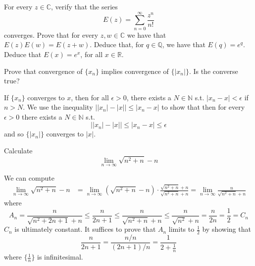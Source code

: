   \begin{exercise}
    For every $z \in \mathbb{C}$, verify that the series
    \begin{equation}
      E(z) = \sum_{n=0}^{\infty} \frac{z^n}{n!}
    \end{equation}
    converges. Prove that for every $z, w \in \mathbb{C}$ we have that $E(z)E(w) = E(z + w)$. Deduce that, for $q \in \mathbb{Q}$, we have that $E(q) = e^q$. Deduce that $E(x) = e^x$, for all $x \in \mathbb{R}$.
  \end{exercise}
  \begin{solution}

  \end{solution}

  
  \begin{exercise}[Rudin 3.1]
    Prove that convergence of $\{x_n\}$ implies convergence of $\{|x_n|\}$. Is the converse true? 
  \end{exercise}
  \begin{solution}
    If $\{x_n\}$ converges to $x$, then for all $\epsilon > 0$, there exists a $N \in \mathbb{N}$ s.t. $|x_n - x| < \epsilon$ if $n > N$. We use the inequality $\big| |x_n| - |x| \big| \leq |x_n - x|$ to show that then for every $\epsilon > 0$ there exists a $N \in \mathbb{N}$ s.t. 
    \begin{equation}
      \big| |x_n| - |x| \big| \leq |x_n - x| \leq \epsilon
    \end{equation}
    and so $\{|x_n|\}$ converges to $|x|$. 
  \end{solution}

  \begin{exercise}[Rudin 3.2]
    Calculate 
    \begin{equation}
      \lim_{n \rightarrow \infty} \sqrt{n^2 + n} - n
    \end{equation}
  \end{exercise}
  \begin{solution}
    We can compute  
    \begin{align*}
        \lim_{n \rightarrow \infty} \sqrt{n^2 + n} - n & = \lim_{n \rightarrow \infty} (\sqrt{n^2 + n} - n) \cdot \frac{\sqrt{n^2 + n} + n}{\sqrt{n^2 + n} + n} = \lim_{n \rightarrow \infty} \frac{n}{\sqrt{n^2 + n} + n}
    \end{align*}
    where 
    \begin{equation}
      A_n = \frac{n}{\sqrt{n^2 + 2n + 1} + n} \leq \frac{n}{2n + 1} \leq \frac{n}{\sqrt{n^2 + n} + n} \leq \frac{n}{\sqrt{n^2} + n} = \frac{n}{2n} = \frac{1}{2} = C_n
    \end{equation}
    $C_n$ is ultimately constant. It suffices to prove that $A_n$ limits to $\frac{1}{2}$ by showing that 
    \begin{equation}
      \frac{n}{2n + 1} = \frac{n/n}{(2n+1)/n} = \frac{1}{2 + \frac{1}{n}}
    \end{equation}
    where $\{\frac{1}{n}\}$ is infinitesimal. 
  \end{solution}

